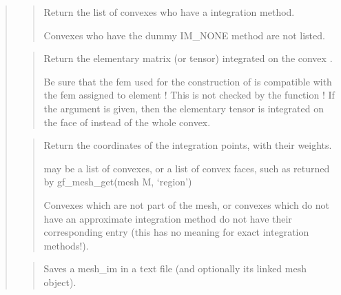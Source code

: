 \documentclass[a4paper,11pt,english]{sphinxmanual}
\begin{document}
\begin{quote}
\begin{quote}

Return the list of convexes who have a integration method.

Convexes who have the dummy IM\_NONE method are not listed.
\end{quote}

\begin{quote}

Return the elementary matrix (or tensor) integrated on the convex .


Be sure that the fem used for the construction of  is compatible
with the fem assigned to element  ! This is not checked by the
function ! If the argument  is given, then the elementary tensor
is integrated on the face  of  instead of the whole convex.
\end{quote}

\begin{quote}

Return the coordinates of the integration points, with their weights.

 may be a list of convexes, or a list of convex faces, such
as returned by gf\_mesh\_get(mesh M, ‘region’)


Convexes which are not part of the mesh, or convexes which
do not have an approximate integration method do not have
their corresponding entry (this has no meaning for exact
integration methods!).
\end{quote}

\begin{quote}

Saves a mesh\_im in a text file (and optionally its linked mesh object).
\end{quote}


\end{quote}
\end{document}
